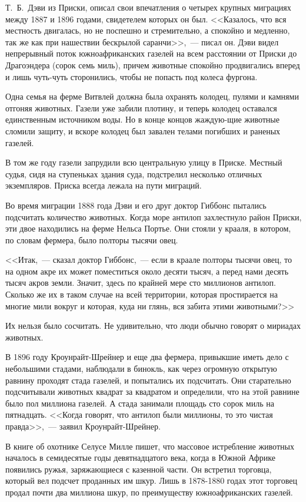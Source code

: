 \documentclass[12pt,a4paper,twoside,openany,svgnames]{memoir}
\begin{document}
 Т.~Б.~Дэви из Приски, описал свои впечатления о четырех крупных миграциях между 1887 и 1896 годами, свидетелем которых он был. <<Казалось, что вся местность двигалась, но не поспешно и стремительно, а спокойно и медленно, так же как при нашествии бескрылой саранчи>>,~--- писал он. Дэви видел непрерывный поток южноафриканских газелей на всем расстоянии от Приски до Драгоэндера (сорок семь миль), причем животные спокойно продвигались вперед и лишь чуть-чуть сторонились, чтобы не попасть под колеса фургона.

Одна семья на ферме Витвлей должна была охранять колодец, пулями и камнями отгоняя животных. Газели уже забили плотину, и теперь колодец оставался единственным источником воды. Но в конце концов жаждую-щие животные сломили защиту, и вскоре колодец был завален телами погибших и раненых газелей.

В том же году газели запрудили всю центральную улицу в Приске. Местный судья, сидя на ступеньках здания суда, подстрелил несколько отличных экземпляров. Приска всегда лежала на пути миграций.

Во время миграции 1888 года Дэви и его друг доктор Гиббонс пытались подсчитать количество животных. Когда море антилоп захлестнуло район Приски, эти двое находились на ферме Нельса Портье. Они стояли у крааля, в котором, по словам фермера, было полторы тысячи овец.

<<Итак,~--- сказал доктор Гиббонс,~--- если в краале полторы тысячи овец, то на одном акре их может поместиться около десяти тысяч, а перед нами десять тысяч акров земли. Значит, здесь по крайней мере сто миллионов антилоп. Сколько же их в таком случае на всей территории, которая простирается на многие мили вокруг и которая, куда ни глянь, вся забита этими животными?>>

Их нельзя было сосчитать. Не удивительно, что люди обычно говорят о мириадах животных.

В 1896 году Кроунрайт-Шрейнер и еще два фермера, привыкшие иметь дело с небольшими стадами, наблюдали в бинокль, как через огромную открытую равнину проходят стада газелей, и попытались их подсчитать. Они старательно подсчитывали животных квадрат за квадратом и определили, что на этой равнине было пол миллиона газелей. А стада занимали площадь сто сорок миль на пятнадцать. <<Когда говорят, что антилоп были миллионы, то это чистая правда>>,~--- заявил Кроунрайт-Шрейнер.

В книге об охотнике Селусе Милле пишет, что массовое истребление животных началось в семидесятые годы девятнадцатого века, когда в Южной Африке появились ружья, заряжающиеся с казенной части. Он встретил торговца, который вел подсчет проданных им шкур. Лишь в 1878-1880 годах этот торговец продал почти два миллиона шкур, по преимуществу южноафриканских газелей.
\end{document}
